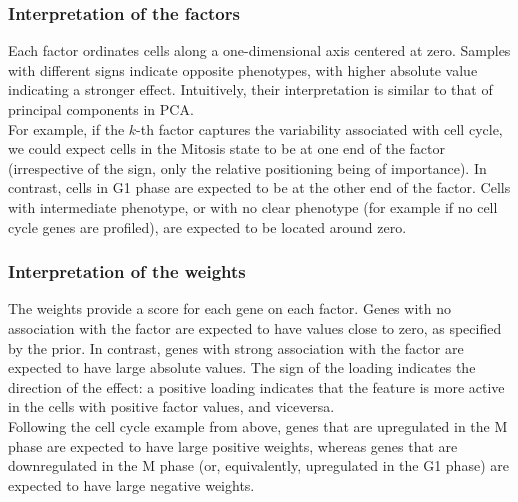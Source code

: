 \subsubsection{Interpretation of the factors} \label{section:interpretation_factors}

Each factor ordinates cells along a one-dimensional axis centered at zero. Samples with different signs indicate opposite phenotypes, with higher absolute value indicating a stronger effect. Intuitively, their interpretation is similar to that of principal components in PCA.\\
For example, if the $k$-th factor captures the variability associated with cell cycle, we could expect cells in the Mitosis state to be at one end of the factor (irrespective of the sign, only the relative positioning being of importance). In contrast, cells in G1 phase are expected to be at the other end of the factor. Cells with intermediate phenotype, or with no clear phenotype (for example if no cell cycle genes are profiled), are expected to be located around zero.


\subsubsection{Interpretation of the weights} \label{section:interpretation_weights}

The weights provide a score for each gene on each factor. Genes with no association with the factor are expected to have values close to zero, as specified by the prior. In contrast, genes with strong association with the factor are expected to have large absolute values. The sign of the loading indicates the direction of the effect: a positive loading indicates that the feature is more active in the cells with positive factor values, and viceversa. \\
Following the cell cycle example from above, genes that are upregulated in the M phase are expected to have large positive weights, whereas genes that are downregulated in the M phase (or, equivalently, upregulated in the G1 phase) are expected to have large negative weights.




